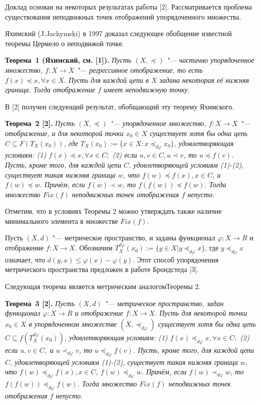 \vzmscaption

Доклад основан на некоторых результатах работы [2]. Рассматривается проблема существования неподвижных точек отображений упорядоченного  множества.

Яхимский (J.Jachymski) в 1997 доказал следующее обобщение известной теоремы Цермело о неподвижой точке.

\textbf{Теорема~1 (Яхимский, см. [1]).}  {\it Пусть  $(X,\preceq)$  "--- частично упорядоченное множество,  $f: X\to X$ "--- регрессивное отображение, то есть $f(x)\preceq x, \forall x\in X$. Пусть для каждой цепи в $X$  задана некоторая её нижняя граница. Тогда отображение $f$ имеет неподвижную точку.}

В [2] получен следующий результат, обобщающий эту теорему Яхимского.

\textbf{Теорема~2 [2].} {\it Пусть $(X,\preceq)$ "--- упорядоченное множество, $f: X\to X$ "--- отображение, и для некоторой точки $x_{0}\in X$ существует хотя бы одна цепь $C\subseteq F(T_{X}(x_{0}))$, где $T_{X}(x_{0}):=\{x\in X : x\preceq_{d\varphi}x_{0}\}$, удовлетворяющая условиям: (1) $ f(x)\preceq x,\forall x\in C;$ (2) если $u,v\in C, u\prec v$, то $u\preceq f(v)$. Пусть, кроме того, для каждой цепи $C$, удовлетворяющей условиям (1)-(2), существует такая нижняя граница $w$, что $f(w)\preceq f(x), x\in C$, и $f(w)\preceq w$. Причём, если $f(w)\prec w$, то $f(f(w))\preceq f(w)$. Тогда множество $Fix(f)$ неподвижных точек отображения $f$ непусто.}

Отметим, что в условиях Теоремы 2 можно утверждать также наличие минимального элемента в множестве $Fix(f)$.


Пусть $(X,d)$ "--- метрическое пространство, и заданы фун\-кционал $\varphi: X\to R$ и отображение $f: X\to X$. Обозначим $T_{X}^{d\varphi}(x_{0}):=\{y\in X | y\preceq_{d \varphi}x\}$, где $y\preceq_{d \varphi}x$ означает, что $d(y,x)\le \varphi(x)-\varphi(y)$. Этот способ упорядочения метрического пространства предложен в работе Брондстеда [3].

Следующая теорема является метрическим аналогом\lb Теоремы 2.

\textbf{Теорема~3 [2].} {\it  Пусть $(X,d)$ "--- метрическое пространство, задан  функционал $\varphi :X\to R$ и  отображение $f: X\to X$. Пусть для некоторой точки $x_{0}\in X$ в упорядоченном множестве $(X, \preceq_{d \varphi})$ существует хотя бы одна цепь $C\subseteq f(T_{X}^{d \varphi}(x_{0}))$, удовлетворяющая условиям: (1) $f(x)\preceq_{d \varphi} x, \forall x\in C;$ (2) если $u,v\in C,$ и $u\prec_{d \varphi} v$, то $u\preceq_{d \varphi} f(v)$. Пусть, кроме того, для каждой цепи $C$, удовлетворяющей условиям (1)-(2), существует такая нижняя граница $w$, что $f(w)\preceq_{d \varphi} f(x), x\in C$, $f(w)\preceq_{d \varphi} w$. Причём, если $f(w)\prec_{d \varphi} w$, то $f(f(w))\preceq_{d \varphi} f(w)$. Тогда множество $Fix(f)$ неподвижных точек отображения $f$ непусто.}

